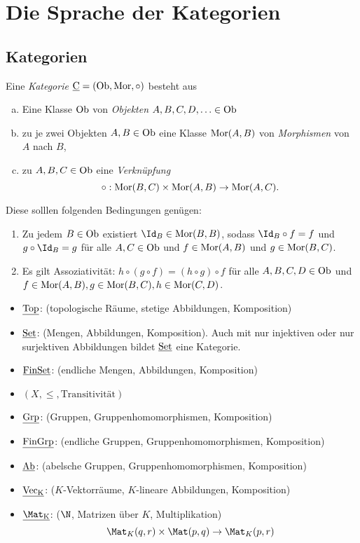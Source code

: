 \chapter{Die Sprache der Kategorien}



\section{Kategorien}


\begin{df}
	Eine \emph{Kategorie} $\underline{\mathrm{C}} = (\mathrm{Ob}, \operatorname{Mor}, \circ)$ besteht aus
	\begin{enumerate}[a)]
		\item
			Eine Klasse $\mathrm{Ob}$ von \emph{Objekten} $A, B, C, D, \dotsc \in \mathrm{Ob}$
		\item
			zu je zwei Objekten $A, B \in \mathrm{Ob}$ eine Klasse $\operatorname{Mor}(A,B)$ von \emph{Morphismen} von $A$ nach $B$,
		\item
			zu $A, B, C \in \mathrm{Ob}$ eine \emph{Verknüpfung}
			\[
				\circ: \operatorname{Mor}(B, C) \times \operatorname{Mor}(A, B) \to \operatorname{Mor}(A, C).
			\]
	\end{enumerate}
	Diese solllen folgenden Bedingungen genügen:
	\begin{enumerate}[1)]
		\item
			Zu jedem $B \in \mathrm{Ob}$ existiert $\Id_B \in \Mor(B, B)$, sodass $\Id_B \circ f = f$ und $g \circ \Id_B = g$ für alle $A, C \in \mathrm{Ob}$ und $f \in \operatorname{Mor}(A, B)$ und $g \in \operatorname{Mor}(B, C)$.
		\item
			Es gilt Assoziativität: $h \circ (g \circ f) = (h \circ g) \circ f$ für alle $A, B, C, D \in \mathrm{Ob}$ und $f \in \operatorname{Mor}(A, B), g \in \operatorname{Mor}(B, C), h \in \operatorname{Mor}(C, D)$.
	\end{enumerate}
\end{df}

\begin{ex}
	\begin{itemize}
		\item
			$\underline{\mathrm{Top}}$: (topologische Räume, stetige Abbildungen, Komposition)
		\item
			$\underline{\mathrm{Set}}$: (Mengen, Abbildungen, Komposition).
			Auch mit nur injektiven oder nur surjektiven Abbildungen bildet $\underline{\mathrm{Set}}$ eine Kategorie.
		\item
			$\underline{\mathrm{FinSet}}$: (endliche Mengen, Abbildungen, Komposition)
		\item
			$(X, \le, \text{Transitivität})$
		\item
			$\underline{\mathrm{Grp}}$: (Gruppen, Gruppenhomomorphismen, Komposition)
		\item
			$\underline{\mathrm{FinGrp}}$: (endliche Gruppen, Gruppenhomomorphismen, Komposition)
		\item
			$\underline{\mathrm{Ab}}$: (abelsche Gruppen, Gruppenhomomorphismen, Komposition)
		\item
			$\underline{\mathrm{\operatorname{Vec}_K}}$: ($K$-Vektorräume, $K$-lineare Abbildungen, Komposition)
		\item
			$\Cat{\Mat_K}$: ($\N$, Matrizen über $K$, Multiplikation)
			\[
				\Mat_K(q,r) \times \Mat(p,q) \to \Mat_K(p,r)
			\]
	\end{itemize}
\end{ex}

